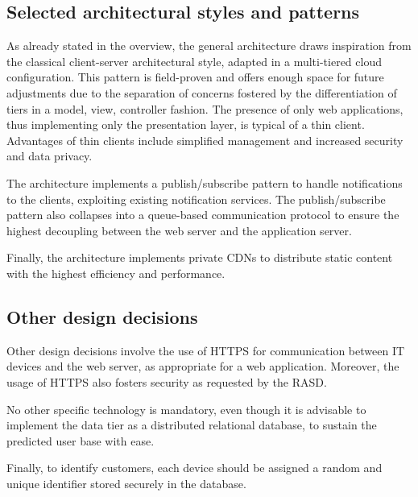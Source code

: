 \documentclass[../../main.tex]{subfiles}
\begin{document}
\subsection{Selected architectural styles and patterns}

    As already stated in the overview, the general architecture draws inspiration from the classical client-server architectural style, adapted in a multi-tiered cloud configuration.  
    This pattern is field-proven and offers enough space for future adjustments due to the separation of concerns fostered by the differentiation of tiers in a model, view, controller fashion.
    The presence of only web applications, thus implementing only the presentation layer, is typical of a thin client. Advantages of thin clients include simplified management and 
    increased security and data privacy.

    The architecture implements a publish/subscribe pattern to handle notifications to the clients, exploiting existing notification services. 
    The publish/subscribe pattern also collapses into a queue-based communication protocol to ensure the highest decoupling between the web server and the application server.

    Finally, the architecture implements private CDNs to distribute static content with the highest efficiency and performance.


\subsection{Other design decisions}

    Other design decisions involve the use of HTTPS for communication between IT devices and the web server, as appropriate for a web application. Moreover, 
    the usage of HTTPS also fosters security as requested by the RASD.

    No other specific technology is mandatory, even though it is advisable to implement the data tier as a distributed relational database, to sustain the predicted user base with ease.

    Finally, to identify customers, each device should be assigned a random and unique identifier stored securely in the database. 
\end{document}
